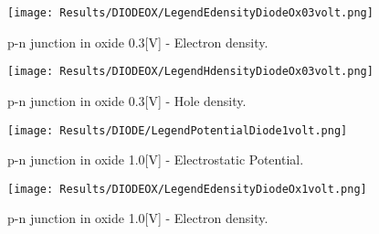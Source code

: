 \vspace{0.5cm}

\begin{figure}[!h]
\centering
{}
\hspace{0.1\textwidth}
\hspace{0.04\textwidth}
{\texttt{[image: Results/DIODEOX/LegendEdensityDiodeOx03volt.png]}}
\caption{p-n junction in oxide 0.3[V] - Electron density.}
\label{fig: edensity diodeox}
\end{figure}

\vspace{0.5cm}

\begin{figure}[!h]
\centering
{}
\hspace{0.1\textwidth}
\hspace{0.04\textwidth}
{\texttt{[image: Results/DIODEOX/LegendHdensityDiodeOx03volt.png]}}
\caption{p-n junction in oxide 0.3[V] - Hole density.}
\label{fig: hdensity diodeox}
\end{figure}

\clearpage


\begin{figure}[!h]
\centering
{}
\hspace{0.1\textwidth}
\hspace{0.04\textwidth}
{\texttt{[image: Results/DIODE/LegendPotentialDiode1volt.png]}}
\caption{p-n junction in oxide 1.0[V] - Electrostatic Potential.}
\label{fig: potential diodeox 1V}
\end{figure}

\vspace{0.5cm}

\begin{figure}[!h]
\centering
{}
\hspace{0.1\textwidth}
\hspace{0.04\textwidth}
{\texttt{[image: Results/DIODEOX/LegendEdensityDiodeOx1volt.png]}}
\caption{p-n junction in oxide 1.0[V] - Electron density.}
\label{fig: edensity diodeox 1V}
\end{figure}

